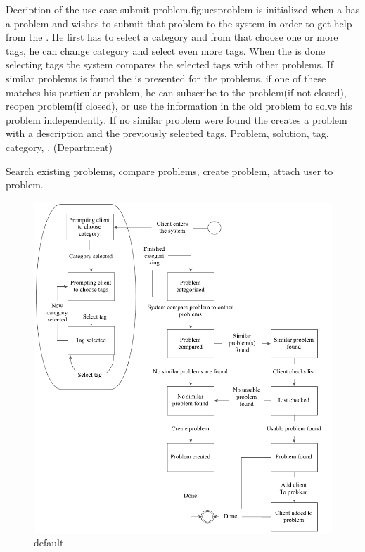 \begin{sadlist}[h]{\ucsproblem[c]}{Decription of the use case submit problem.}{fig:ucsproblem}
 \ucsproblem[c] is initialized when a \aclient{} has a problem and wishes to submit that problem to the system in order to get help from the \astaff{}. 
He first has to select a category and from that choose one or more tags, he can change category and select even more tags. 
When the \aclient{} is done selecting tags the system compares the selected tags with other problems. 
If similar problems is found the \aclient{} is presented for the problems.
if one of these matches his particular problem, he can subscribe to the problem(if not closed), reopen problem(if closed), or use the information in the old problem to solve his problem independently. 
If no similar problem were found the \aclient{} creates a problem with a description and the previously selected tags. 
 Problem, solution, tag, category, \client. (Department)

 Search existing problems, compare problems, create problem, attach user to problem.


\end{sadlist}

\begin{figure}[htbp]
\begin{center}
 \includegraphics[scale=1]{input/application_domain_analysis/submit_problem_use_case}
\caption{default}
\label{default}
\end{center}
\end{figure}
